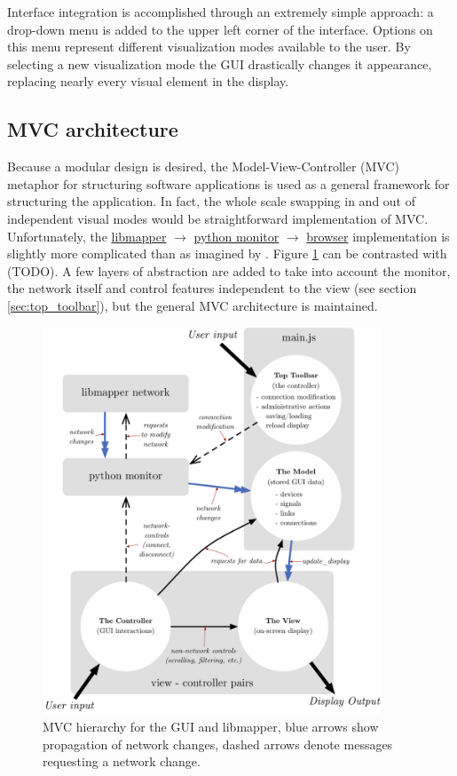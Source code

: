 Interface integration is accomplished through an extremely simple approach: a drop-down menu is added to the upper left corner of the interface. Options on this menu represent different visualization modes available to the user. By selecting a new visualization mode the GUI drastically changes it appearance, replacing nearly every visual element in the display.

	\subsection{MVC architecture} %
	\label{sec:mvc_architecture}

Because a modular design is desired, the Model-View-Controller (MVC) metaphor for structuring software applications \cite{MVC_krasnerpope} is used as a general framework for structuring the application. In fact, the whole scale swapping in and out of independent visual modes would be straightforward implementation of MVC. Unfortunately, the \url{libmapper} $\rightarrow$ \url{python monitor} $\rightarrow$ \url{browser} implementation is slightly more complicated than as imagined by . Figure \ref{fig:mapper_network} can be contrasted with (TODO). A few layers of abstraction are added to take into account the monitor, the network itself and control features independent to the view (see section \ref{sec:top_toolbar}), but the general MVC architecture is maintained.

\begin{figure}[!ht]
\centering
	\includegraphics[width=0.9\textwidth]{figures/mapper_network2}
\caption{MVC hierarchy for the GUI and libmapper, blue arrows show propagation of network changes, dashed arrows denote messages requesting a network change.}
\label{fig:mapper_network}
\end{figure}


